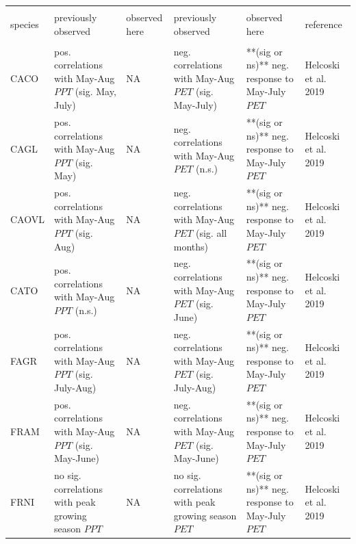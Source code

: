 \documentclass[
]{article}
\begin{document}
\begin{longtable}{l>{\raggedright\arraybackslash}p{2.5cm}>{\raggedright\arraybackslash}p{2.5cm}>{\raggedright\arraybackslash}p{2.5cm}>{\raggedright\arraybackslash}p{2.5cm}>{\raggedright\arraybackslash}p{2cm}}
\toprule
\multicolumn{1}{c}{ } & \multicolumn{2}{c}{Precipitation response} & \multicolumn{2}{c}{Temperature response} \\
\cmidrule(l{3pt}r{3pt}){2-3} \cmidrule(l{3pt}r{3pt}){4-5}
species & previously observed & observed here & previously observed & observed here & reference\\
\midrule
\addlinespace[1em]
\multicolumn{4}{l}{\textbf{Smithsonian Conservation Biology Institute, Virginia, USA}}\\
\hspace{1em}CACO & pos. correlations with May-Aug $PPT$ (sig. May, July) & NA & neg. correlations with May-Aug $PET$ (sig. May-July) & **(sig or ns)** neg. response to May-July $PET$ & Helcoski et al. 2019\\
\hspace{1em}CAGL & pos. correlations with May-Aug $PPT$ (sig. May) & NA & neg. correlations with May-Aug $PET$ (n.s.) & **(sig or ns)** neg. response to May-July $PET$ & Helcoski et al. 2019\\
\hspace{1em}CAOVL & pos. correlations with May-Aug $PPT$ (sig. Aug) & NA & neg. correlations with May-Aug $PET$ (sig. all months) & **(sig or ns)** neg. response to May-July $PET$ & Helcoski et al. 2019\\
\hspace{1em}CATO & pos. correlations with May-Aug $PPT$ (n.s.) & NA & neg. correlations with May-Aug $PET$ (sig. June) & **(sig or ns)** neg. response to May-July $PET$ & Helcoski et al. 2019\\
\hspace{1em}FAGR & pos. correlations with May-Aug $PPT$ (sig. July-Aug) & NA & neg. correlations with May-Aug $PET$ (sig. July-Aug) & **(sig or ns)** neg. response to May-July $PET$ & Helcoski et al. 2019\\
\hspace{1em}FRAM & pos. correlations with May-Aug $PPT$ (sig. May-June) & NA & neg. correlations with May-Aug $PET$ (sig. May-June) & **(sig or ns)** neg. response to May-July $PET$ & Helcoski et al. 2019\\
\hspace{1em}FRNI & no sig. correlations with peak growing season $PPT$ & NA & no sig. correlations with peak growing season $PET$ & **(sig or ns)** neg. response to May-July $PET$ & Helcoski et al. 2019\\

\end{longtable}
\end{document}

